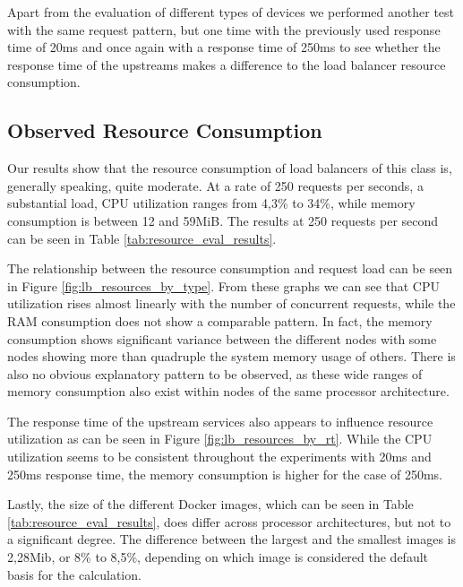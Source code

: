 Apart from the evaluation of different types of devices we performed another test with the same request pattern, but one time with the previously used response time of 20ms and once again with a response time of 250ms to see whether the response time of the upstreams makes a difference to the load balancer resource consumption.
\subsection{Observed Resource Consumption}
Our results show that the resource consumption of load balancers of this class is, generally speaking, quite moderate.
At a rate of 250 requests per seconds, a substantial load, CPU utilization ranges from 4,3\% to 34\%, while memory consumption is between 12 and 59MiB.
The results at 250 requests per second can be seen in Table \ref{tab:resource_eval_results}.

The relationship between the resource consumption and request load can be seen in Figure \ref{fig:lb_resources_by_type}.
From these graphs we can see that CPU utilization rises almost linearly with the number of concurrent requests, while the RAM consumption does not show a comparable pattern.
In fact, the memory consumption shows significant variance between the different nodes with some nodes showing more than quadruple the system memory usage of others.
There is also no obvious explanatory pattern to be observed, as these wide ranges of memory consumption also exist within nodes of the same processor architecture.

The response time of the upstream services also appears to influence resource utilization as can be seen in Figure \ref{fig:lb_resources_by_rt}.
While the CPU utilization seems to be consistent throughout the experiments with 20ms and 250ms response time, the memory consumption is higher for the case of 250ms.

Lastly, the size of the different Docker images, which can be seen in Table \ref{tab:resource_eval_results}, does differ across processor architectures, but not to a significant degree.
The difference between the largest and the smallest images is 2,28Mib, or 8\% to 8,5\%, depending on which image is considered the default basis for the calculation.


